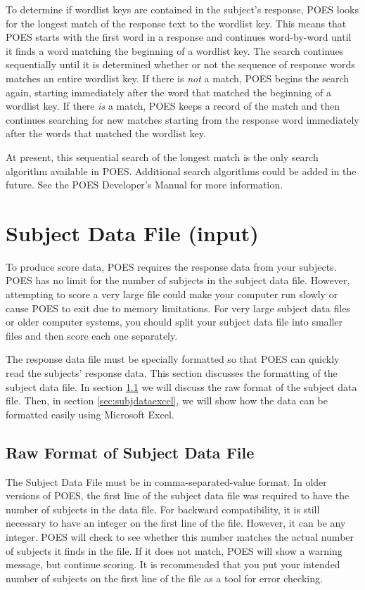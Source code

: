 \documentclass[11pt]{article}
\numberwithin{figure}{section}
\numberwithin{table}{section}
\begin{document}
To determine if wordlist keys are contained in the subject's response, POES looks for the longest match of the response text to the wordlist key.  This means that POES starts with the first word in a response and continues word-by-word until it finds a word matching the beginning of a wordlist key.  The search continues sequentially until it is determined whether or not the sequence of response words matches an entire wordlist key.  If there is \emph{not} a match, POES begins the search again, starting immediately after the word that matched the beginning of a wordlist key.  If there \emph{is} a match, POES keeps a record of the match and then continues searching for new matches starting from the response word immediately after the words that matched the wordlist key. 

At present, this sequential search of the longest match is the only search algorithm available in POES.  Additional search algorithms could be added in the future.  See the POES Developer's Manual for more information.
 
 \section{Subject Data File (input)}  
\label{sec:subjdatafile}
To produce score data, POES requires the response data from your subjects.  POES has no limit for the number of subjects in the subject data file.  However, attempting to score a very large file could make your computer run slowly or cause POES to exit due to memory limitations.  For very large subject data files or older computer systems, you should split your subject data file into smaller files and then score each one separately.

The response data file must be specially formatted so that POES can quickly read the subjects' response data.  This section discusses the formatting of the subject data file.  In section \ref{sec:rawsubjdata} we will discuss the raw format of the subject data file.  Then, in section \ref{sec:subjdataexcel}, we will show how the data can be formatted easily using Microsoft Excel.

\subsection{Raw Format of Subject Data File}
\label{sec:rawsubjdata}

The Subject Data File must be in comma-separated-value format.  In older versions of POES, the first line of the subject data file was required to have the number of subjects in the data file.  For backward compatibility, it is still necessary to have an integer on the first line of the file.  However, it can be any integer.  POES will check to see whether this number matches the actual number of subjects it finds in the file.  If it does not match, POES will show a warning message, but continue scoring.  It is recommended that you put your intended number of subjects on the first line of the file as a tool for error checking.  
\end{document}
